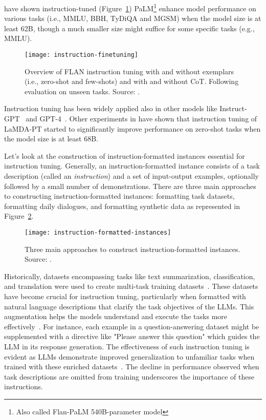\textcite{chung2022scaling} have shown instruction-tuned (Figure~\ref{fig:instruction-finetuning}) PaLM\footnote{Also called Flan-PaLM 540B-parameter model} enhance model performance on various tasks (i.e., MMLU, BBH, TyDiQA and MGSM) when the model size is at least 62B, though a much smaller size might suffice for some specific tasks (e.g., MMLU).

\begin{figure}[h!]
	\centering
	\texttt{[image: instruction-finetuning]}
	\caption{Overview of FLAN instruction tuning with and without exemplars (i.e., zero-shot and few-shots) and with and without CoT. Following evaluation on unseen tasks. Source: \textcite{chung2022scaling}.}
	\label{fig:instruction-finetuning}
\end{figure}

Instruction tuning has been widely applied also in other models like Instruct-GPT~\cite{ouyang2022training} and GPT-4~\cite{radford2023gpt4}.
Other experiments in \textcite{wei2022fine} have shown that instruction tuning of LaMDA-PT started to significantly improve performance on zero-shot tasks when the model size is at least 68B\@.

Let's look at the construction of instruction-formatted instances essential for instruction tuning.
Generally, an instruction-formatted instance consists of a task description (called an \textit{instruction}) and a set of input-output examples, optionally followed by a small number of demonstrations.
There are three main approaches to constructing instruction-formatted instances: formatting task datasets, formatting daily dialogues, and formatting synthetic data as represented in Figure~\ref{fig:instruction-formatted-instances}.

\begin{figure}[h!]
	\centering
	\texttt{[image: instruction-formatted-instances]}
	\caption{Three main approaches to construct instruction-formatted instances. Source: \textcite{survey}.}
	\label{fig:instruction-formatted-instances}
\end{figure}

Historically, datasets encompassing tasks like text summarization, classification, and translation were used to create multi-task training datasets~\cite{tang2022mvp,liu2019multi,aghajanyan2021muppet}.
These datasets have become crucial for instruction tuning, particularly when formatted with natural language descriptions that clarify the task objectives of the LLMs. This augmentation helps the models understand and execute the tasks more effectively~\cite{sanhetal2022multitask,ouyang2022training,wei2022fine, wang2022super}.
For instance, each example in a question-answering dataset might be supplemented with a directive like "Please answer this question" which guides the LLM in its response generation.
The effectiveness of such instruction tuning is evident as LLMs demonstrate improved generalization to unfamiliar tasks when trained with these enriched datasets~\cite{wei2022fine}.
The decline in performance observed when task descriptions are omitted from training underscores the importance of these instructions.


